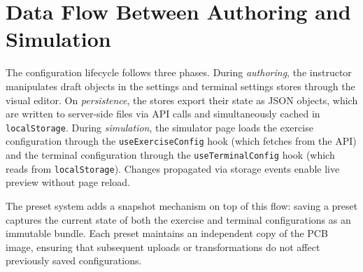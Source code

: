 \section{Data Flow Between Authoring and Simulation}\label{sec:dataflow}

The configuration lifecycle follows three phases. During \emph{authoring}, the instructor manipulates draft objects in the settings and terminal settings stores through the visual editor. On \emph{persistence}, the stores export their state as JSON objects, which are written to server-side files via API calls and simultaneously cached in \texttt{localStorage}. During \emph{simulation}, the simulator page loads the exercise configuration through the \texttt{useExerciseConfig} hook (which fetches from the API) and the terminal configuration through the \texttt{useTerminalConfig} hook (which reads from \texttt{localStorage}). Changes propagated via storage events enable live preview without page reload.

The preset system adds a snapshot mechanism on top of this flow: saving a preset captures the current state of both the exercise and terminal configurations as an immutable bundle. Each preset maintains an independent copy of the PCB image, ensuring that subsequent uploads or transformations do not affect previously saved configurations.

